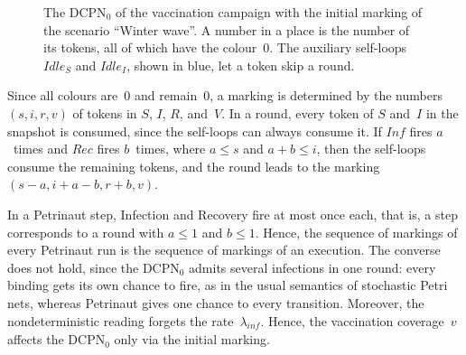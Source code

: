 \documentclass[11pt]{article}
\theoremstyle{definition}
\newcommand{\DCPN}[1]{\texorpdfstring{\textup{DCPN}\ensuremath{_{#1}}}{DCPN#1}}
\begin{document}
\begin{figure}[t]
  \centering
  \caption{The \DCPN{0} of the vaccination campaign with the initial marking
    of the scenario ``Winter wave''. A number in a place is the number of
    its tokens, all of which have the colour~$0$. The auxiliary self-loops
    $\mathit{Idle}_S$ and $\mathit{Idle}_I$, shown in blue, let a token skip
    a round.}
  \label{fig:vaccination}
\end{figure}

Since all colours are~$0$ and remain~$0$, a marking is determined by the
numbers $(s, i, r, v)$ of tokens in $S$, $I$, $R$, and~$V$. In a round,
every token of $S$ and~$I$ in the snapshot is consumed, since the
self-loops can always consume it. If $\mathit{Inf}$ fires $a$~times and
$\mathit{Rec}$ fires $b$~times, where $a \le s$ and $a + b \le i$, then the
self-loops consume the remaining tokens, and the round leads to the marking
$(s - a, i + a - b, r + b, v)$.

In a Petrinaut step, Infection and Recovery fire at most once each, that
is, a step corresponds to a round with $a \le 1$ and $b \le 1$. Hence, the
sequence of markings of every Petrinaut run is the sequence of markings of
an execution. The converse does not hold, since the \DCPN{0} admits several
infections in one round: every binding gets its own chance to fire, as in
the usual semantics of stochastic Petri nets, whereas Petrinaut gives one
chance to every transition. Moreover, the nondeterministic reading forgets
the rate~$\lambda_{\mathit{inf}}$. Hence, the vaccination coverage~$v$
affects the \DCPN{0} only via the initial marking.
\end{document}
